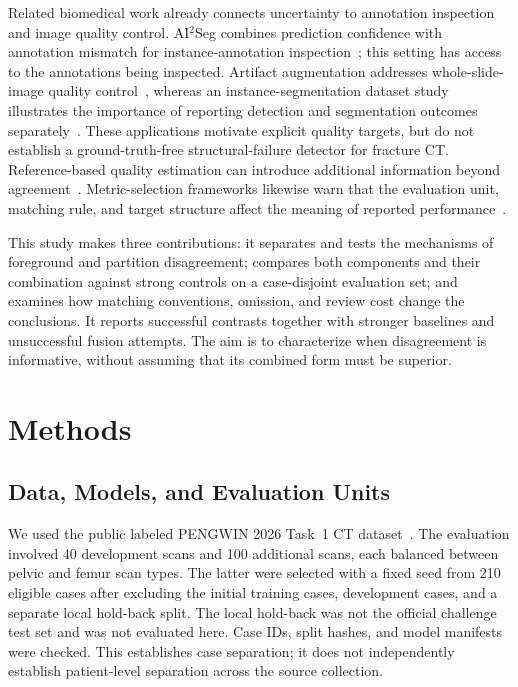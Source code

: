 \documentclass[conference]{IEEEtran}
\begin{document}
Related biomedical work already connects uncertainty to annotation inspection and image quality control. AI$^2$Seg combines prediction confidence with annotation mismatch for instance-annotation inspection~\cite{schilling2023}; this setting has access to the annotations being inspected. Artifact augmentation addresses whole-slide-image quality control~\cite{jurgas2023}, whereas an instance-segmentation dataset study illustrates the importance of reporting detection and segmentation outcomes separately~\cite{reich2023}. These applications motivate explicit quality targets, but do not establish a ground-truth-free structural-failure detector for fracture CT. Reference-based quality estimation can introduce additional information beyond agreement~\cite{valindria2017}. Metric-selection frameworks likewise warn that the evaluation unit, matching rule, and target structure affect the meaning of reported performance~\cite{reinke2024,maier2024}.

This study makes three contributions: it separates and tests the mechanisms of foreground and partition disagreement; compares both components and their combination against strong controls on a case-disjoint evaluation set; and examines how matching conventions, omission, and review cost change the conclusions. It reports successful contrasts together with stronger baselines and unsuccessful fusion attempts. The aim is to characterize when disagreement is informative, without assuming that its combined form must be superior.

\section{Methods}
\subsection{Data, Models, and Evaluation Units}
We used the public labeled PENGWIN 2026 Task~1 CT dataset~\cite{pengwin2026}. The evaluation involved 40 development scans and 100 additional scans, each balanced between pelvic and femur scan types. The latter were selected with a fixed seed from 210 eligible cases after excluding the initial training cases, development cases, and a separate local hold-back split. The local hold-back was not the official challenge test set and was not evaluated here. Case IDs, split hashes, and model manifests were checked. This establishes case separation; it does not independently establish patient-level separation across the source collection.
\end{document}
